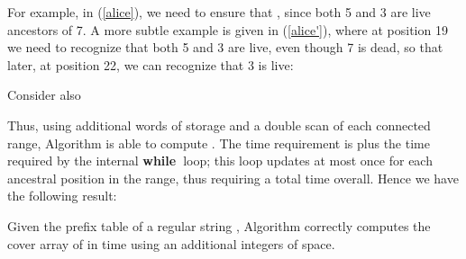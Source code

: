 \documentclass[runningheads,a4paper]{llncs}
\def\s#1{\mbox{\boldmath }}
\def\bwhile{{\bf while\ }}
\begin{document}
For example, in (\ref{alice}),
we need to ensure that ,
since both 5 and 3 are live ancestors of 7.
A more subtle example is given in (\ref{alice'}),
where at position 19 we need to recognize that both 5 and 3 are live,
even though 7 is dead,
so that later, at position 22, we can recognize that 3 is live:

 

Consider also




Thus, using  additional words of storage and a double scan of each connected range,
Algorithm  is able to compute .
The time requirement is  plus the time required by the internal \bwhile loop;
this loop updates  at most once for each ancestral position  in the range,
thus requiring a total  time overall. Hence we have the following result:

\bigskip
\begin{theorem}
Given the prefix table  of a regular string ,
Algorithm  correctly computes the cover array  of \s{x}
in  time using an additional  integers of space.
\end{theorem}
\end{document}

